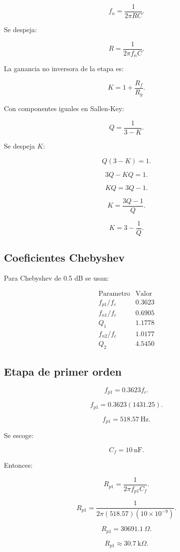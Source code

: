 \documentclass[11pt,letterpaper]{article}
\begin{document}
\[
f_n=\frac{1}{2\pi RC}.
\]

Se despeja:

\[
R=\frac{1}{2\pi f_n C}.
\]

La ganancia no inversora de la etapa es:

\[
K=1+\frac{R_f}{R_g}.
\]

Con componentes iguales en Sallen-Key:

\[
Q=\frac{1}{3-K}.
\]

Se despeja \(K\):

\[
Q(3-K)=1.
\]

\[
3Q-KQ=1.
\]

\[
KQ=3Q-1.
\]

\[
K=\frac{3Q-1}{Q}.
\]

\[
K=3-\frac{1}{Q}.
\]

\subsection{Coeficientes Chebyshev}

Para Chebyshev de 0.5 dB se usan:

\[
\begin{array}{c|c}
\text{Parametro} & \text{Valor} \\
\hline
f_{p1}/f_c & 0.3623\\
f_{n1}/f_c & 0.6905\\
Q_1 & 1.1778\\
f_{n2}/f_c & 1.0177\\
Q_2 & 4.5450
\end{array}
\]

\subsection{Etapa de primer orden}

\[
f_{p1}=0.3623f_c.
\]

\[
f_{p1}=0.3623(1431.25).
\]

\[
f_{p1}=518.57~\text{Hz}.
\]

Se escoge:

\[
C_f=10~\text{nF}.
\]

Entonces:

\[
R_{p1}=
\frac{1}{2\pi f_{p1}C_f}.
\]

\[
R_{p1}=
\frac{1}
{2\pi(518.57)(10\times 10^{-9})}.
\]

\[
R_{p1}=30691.1~\Omega.
\]

\[
\boxed{R_{p1}\approx 30.7~\text{k}\Omega}.
\]
\end{document}
